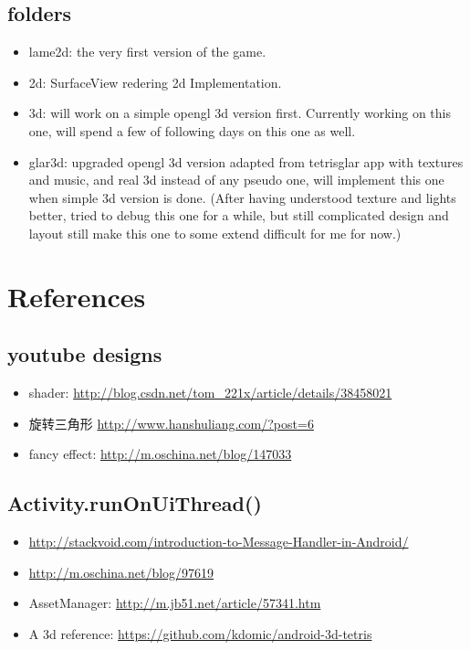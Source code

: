 \documentclass[9pt,b5paper]{article}
\begin{document}
\subsection{folders}
\label{sec-1-2}
\begin{itemize}
\item lame2d: the very first version of the game.
\item 2d: SurfaceView redering 2d Implementation.
\item 3d: will work on a simple opengl 3d version first. Currently working on this one, will spend a few of following days on this one as well.
\item glar3d: upgraded opengl 3d version adapted from tetrisglar app with textures and music, and real 3d instead of any pseudo one, will implement this one when simple 3d version is done. (After having understood texture and lights better, tried to debug this one for a while, but still complicated design and layout still make this one to some extend difficult for me for now.)
\end{itemize}

\section{References}
\label{sec-2}
\subsection{youtube designs}
\label{sec-2-1}
\begin{itemize}
\item shader: \url{http://blog.csdn.net/tom_221x/article/details/38458021}
\item 旋转三角形 \url{http://www.hanshuliang.com/?post=6}
\item fancy effect: \url{http://m.oschina.net/blog/147033}
\end{itemize}

\subsection{Activity.runOnUiThread()}
\label{sec-2-2}
\begin{itemize}
\item \url{http://stackvoid.com/introduction-to-Message-Handler-in-Android/}
\item \url{http://m.oschina.net/blog/97619}
\item AssetManager: \url{http://m.jb51.net/article/57341.htm}
\item A 3d reference: \url{https://github.com/kdomic/android-3d-tetris}
\end{itemize}
\end{document}
